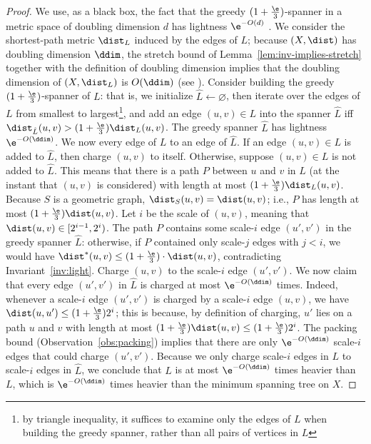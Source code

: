\begin{proof}
    We use, as a black box, the fact that the greedy $(1+\frac \e 3)$-spanner in a metric space of doubling dimension $d$ has lightness $\e^{-O(d)}$ \cite{BLW19}. We consider the shortest-path metric $\dist_L$ induced by the edges of $L$; because $(X, \dist)$ has doubling dimension $\ddim$, the stretch bound of Lemma~\ref{lem:inv-implies-stretch} together with the definition of doubling dimension implies that the doubling dimension of $(X, \dist_L)$ is $O(\ddim)$ (see \cite[Observation 7]{FS20}).
    Consider building the greedy $(1+ \frac \e 3)$-spanner  of $L$: that is, we initialize $\hat L \gets \varnothing$, then iterate over the edges of $L$ from smallest to largest\footnote{by triangle inequality, it suffices to examine only the edges of $L$ when building the greedy spanner, rather than all pairs of vertices in $L$}, and add an edge $(u,v) \in L$ into the spanner $\hat L$ iff $\dist_{\hat L}(u,v) > (1+ \frac \e 3) \dist_L(u,v)$. 
    The greedy spanner $\hat L$ has lightness $\e^{-O(\ddim)}$.
    We now  every edge of $L$ to an edge of $\hat L$. If an edge $(u,v) \in L$ is added to $\hat L$, then charge $(u,v)$ to itself. 
    Otherwise, suppose $(u,v) \in L$ is not added to $\hat L$. This means that there is a path $P$ between $u$ and $v$ in $\hat L$ (at the instant that $(u,v)$ is considered) with length at most $(1+ \frac \e 3) \dist_L(u,v)$. 
    Because $S$ is a geometric graph, $\dist_S(u,v) = \dist(u,v)$; i.e., $P$ has length at most $(1+ \frac \e 3)\dist(u,v)$. Let $i$ be the scale of $(u,v)$, meaning that $\dist(u,v) \in [2^{i-1}, 2^i)$. 
    The path $P$ contains some scale-$i$ edge $(u',v')$ in the greedy spanner $\hat L$: otherwise, if $P$ contained only scale-$j$ edges with $j < i$, we would have $\dist^*(u,v) \le (1+ \frac \e 3) \cdot \dist(u,v)$, contradicting Invariant~\ref{inv:light}. Charge $(u,v)$ to the scale-$i$ edge $(u',v')$.
%
    We now claim that every edge $(u',v')$ in $\hat L$ is charged at most $\e^{-O(\ddim)}$ times. Indeed, whenever a scale-$i$ edge $(u',v')$ is charged by a scale-$i$ edge $(u,v)$, we have $\dist(u,u') \le (1+\frac \e 3) 2^i$; this is because, by definition of charging, $u'$ lies on a path $u$ and $v$ with length at most $(1+ \frac \e 3) \dist(u,v) \le (1+ \frac \e 3) 2^i$. The packing bound (Observation~\ref{obs:packing}) implies that there are only $\e^{-O(\ddim)}$ scale-$i$ edges that could charge $(u',v')$. Because we only charge scale-$i$ edges in $L$ to scale-$i$ edges in $\hat L$, we conclude that $L$ is at most $\e^{-O(\ddim)}$ times heavier than $L$, which is $\e^{-O(\ddim)}$ times heavier than the minimum spanning tree on $X$.
\end{proof}
%
%
